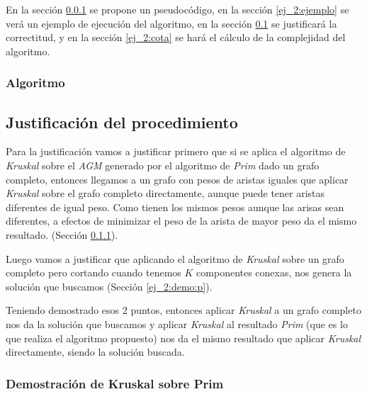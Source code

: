 En la secci\'on \ref{ej_2:algoritmo} se propone un pseudoc\'odigo, en la secci\'on \ref{ej_2:ejemplo} se ver\'a un ejemplo de ejecuci\'on del algoritmo,
en la secci\'on \ref{ej_2:justificacion} se justificar\'a la correctitud, y en la secci\'on \ref{ej_2:cota} se har\'a el c\'alculo de la complejidad del algoritmo.

\subsubsection{Algoritmo} \label{ej_2:algoritmo}




\subsection{Justificaci\'on del procedimiento} \label{ej_2:justificacion}

Para la justificaci\'on vamos a justificar primero que si se aplica el algoritmo de \emph{Kruskal} sobre el \emph{AGM} generado por el algoritmo de \emph{Prim} dado un grafo completo, entonces llegamos a un grafo con pesos de aristas iguales que aplicar \emph{Kruskal} sobre el grafo completo directamente, aunque puede tener aristas diferentes de igual peso. Como tienen los mismos pesos aunque las arisas sean diferentes, a efectos de minimizar el peso de la arista de mayor peso da el mismo resultado. (Secci\'on \ref{ej_2:demo:k}).

Luego vamos a justificar que aplicando el algoritmo de \emph{Kruskal} sobre un grafo completo pero cortando cuando tenemos $K$ componentes conexas, nos genera la soluci\'on que buscamos (Secci\'on \ref{ej_2:demo:p}).

Teniendo demostrado esos 2 puntos, entonces aplicar \emph{Kruskal} a un grafo completo nos da la soluci\'on que buscamos y aplicar \emph{Kruskal} al resultado \emph{Prim} (que es lo que realiza el algoritmo propuesto) nos da el mismo resultado que aplicar \emph{Kruskal} directamente, siendo la soluci\'on buscada.

\subsubsection{Demostraci\'on de Kruskal sobre Prim} \label{ej_2:demo:k}

